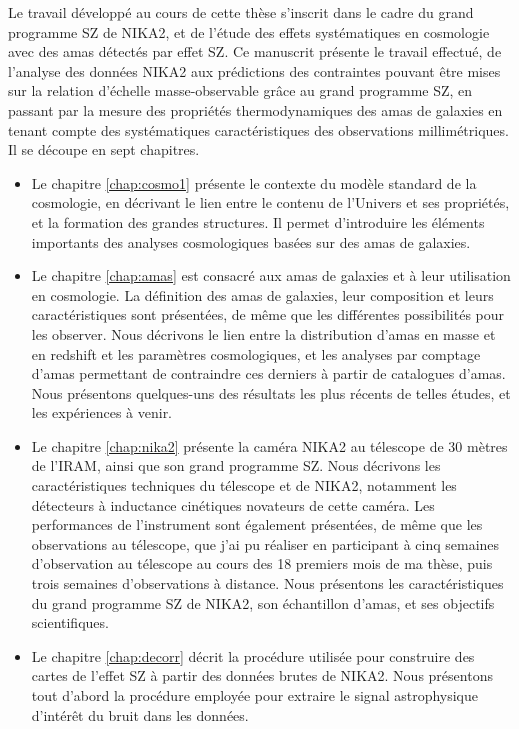 Le travail développé au cours de cette thèse s'inscrit dans le cadre du grand programme SZ de NIKA2, et de l'étude des effets systématiques en cosmologie avec des amas détectés par effet SZ.
Ce manuscrit présente le travail effectué, de l'analyse des données NIKA2 aux prédictions des contraintes pouvant être mises sur la relation d'échelle masse-observable grâce au grand programme SZ, en passant par la mesure des propriétés thermodynamiques des amas de galaxies en tenant compte des systématiques caractéristiques des observations millimétriques.
Il se découpe en sept chapitres.
\begin{itemize}[leftmargin=*]
\setlength\itemsep{5pt}
\item
    Le chapitre \ref{chap:cosmo1} présente le contexte du modèle standard de la cosmologie, en décrivant le lien entre le contenu de l'Univers et ses propriétés, et la formation des grandes structures.
    Il permet d'introduire les éléments importants des analyses cosmologiques basées sur des amas de galaxies.
\item
    Le chapitre \ref{chap:amas} est consacré aux amas de galaxies et à leur utilisation en cosmologie.
    La définition des amas de galaxies, leur composition et leurs caractéristiques sont présentées, de même que les différentes possibilités pour les observer.
   Nous décrivons le lien entre la distribution d'amas en masse et en redshift et les paramètres cosmologiques, et les analyses par comptage d'amas permettant de contraindre ces derniers à partir de catalogues d'amas.
   Nous présentons quelques-uns des résultats les plus récents de telles études, et les expériences à venir.
\item
    Le chapitre \ref{chap:nika2} présente la caméra NIKA2 au télescope de 30 mètres de l'IRAM, ainsi que son grand programme SZ.
    Nous décrivons les caractéristiques techniques du télescope et de NIKA2, notamment les détecteurs à inductance cinétiques novateurs de cette caméra.
    Les performances de l'instrument sont également présentées, de même que les observations au télescope, que j'ai pu réaliser en participant à cinq semaines d'observation au télescope au cours des 18 premiers mois de ma thèse, puis trois semaines d'observations à distance.
    Nous présentons les caractéristiques du grand programme SZ de NIKA2, son échantillon d'amas, et ses objectifs scientifiques.
\item
    Le chapitre \ref{chap:decorr} décrit la procédure utilisée pour construire des cartes de l'effet SZ à partir des données brutes de NIKA2.
    Nous présentons tout d'abord la procédure employée pour extraire le signal astrophysique d'intérêt du bruit dans les données.

\end{itemize}
